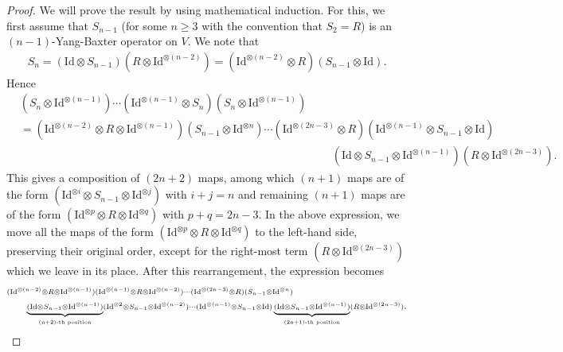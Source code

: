 \documentclass[a4paper,reqno,10pt]{amsart}
\theoremstyle{plain}
\theoremstyle{definition}
\theoremstyle{remark}
\begin{document}
\begin{proof}
   We will prove the result by using mathematical induction. For this, we first assume that $S_{n-1}$ (for some $n\ge3$ with the convention that $S_2=R$) is an $(n-1)$-Yang-Baxter operator on $V$. We note that
\begin{align*}
      S_{n}=(\mathrm{Id}\otimes S_{n-1})(R\otimes \mathrm{Id}^{\otimes(n-2)})=(\mathrm{Id}^{\otimes(n-2)}\otimes R)(S_{n-1}\otimes \mathrm{Id}).
\end{align*}Hence 
\begin{align*}
    &(S_{n}\otimes \mathrm{Id}^{\otimes (n-1)})\cdots(\mathrm{Id}^{\otimes(n-1)}\otimes S_n)(S_n\otimes \mathrm{Id}^{\otimes(n-1)})\\
    &=(\mathrm{Id}^{\otimes(n-2)}\otimes R\otimes \mathrm{Id}^{\otimes(n-1)})(S_{n-1}\otimes \mathrm{Id}^{\otimes n})\cdots (\mathrm{Id}^{\otimes(2n-3)}\otimes R)(\mathrm{Id}^{\otimes(n-1)}\otimes S_{n-1}\otimes \mathrm{Id})\\&\qquad\qquad\qquad\qquad\qquad\qquad\qquad\qquad\qquad\qquad\qquad\qquad\qquad\qquad(\mathrm{Id}\otimes S_{n-1}\otimes \mathrm{Id}^{\otimes(n-1)})(R\otimes \mathrm{Id}^{\otimes(2n-3)}).
\end{align*}
This gives a composition of $(2n+2)$ maps, among which $(n+1)$ maps are of the form $(\mathrm{Id}^{\otimes i}\otimes S_{n-1}\otimes \mathrm{Id}^{\otimes j})$ with $i+j=n$ and remaining $(n+1)$ maps are of the form $(\mathrm{Id}^{\otimes p}\otimes R\otimes \mathrm{Id}^{\otimes q})$ with $p+q=2n-3$. In the above expression, we move all the maps of the form $(\mathrm{Id}^{\otimes p}\otimes R\otimes \mathrm{Id}^{\otimes q})$ to the left-hand side, preserving their original order, except for the right-most term $(R\otimes \mathrm{Id}^{\otimes (2n-3)})$ which we leave in its place. After this rearrangement, the expression becomes
\begin{align*}
    &  {\scriptstyle (\mathrm{Id}^{\otimes(n-2)}\otimes R\otimes \mathrm{Id}^{\otimes(n-1)})(\mathrm{Id}^{\otimes(n-1)}\otimes R\otimes \mathrm{Id}^{\otimes(n-2)})\cdots(\mathrm{Id}^{\otimes (2n-3)}\otimes R)(S_{n-1}\otimes \mathrm{Id}^{\otimes n}) } \\
    &\qquad {\scriptstyle  \underbrace{ {\scriptstyle (\mathrm{Id}\otimes S_{n-1}\otimes \mathrm{Id}^{\otimes(n-1)}) } }_{\mbox{\tiny (n+2)\text{\tiny-th position}}}(\mathrm{Id}^{\otimes 2}\otimes S_{n-1}\otimes \mathrm{Id}^{\otimes(n-2)} ) \cdots(\mathrm{Id}^{\otimes(n-1)}\otimes S_{n-1}\otimes \mathrm{Id})\underbrace{   {\scriptstyle (\mathrm{Id}\otimes S_{n-1}\otimes \mathrm{Id}^{\otimes(n-1)}) }  }_{\mbox{\tiny (2n+1)\text{\tiny-th position}}} (R\otimes \mathrm{Id}^{\otimes(2n-3)}) }.

\end{align*}
\end{proof}
\end{document}
